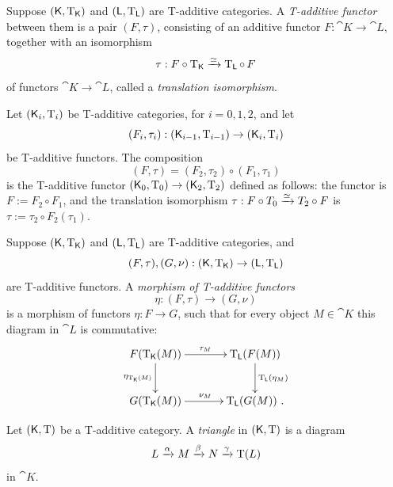 \begin{dfn} \label{dfn:1159} 
Suppose $(\operatorname{\mathsf{K}}, \operatorname{T}_{\operatorname{\mathsf{K}}})$ and 
$(\operatorname{\mathsf{L}}, \operatorname{T}_{\operatorname{\mathsf{L}}})$ are T-additive categories.
A {\em T-additive functor} between them is a pair 
$(F, \tau)$, consisting of an additive functor $F : \cat{K} \to \cat{L}$, 
together with an isomorphism
\[ \tau :  F \circ \operatorname{T}_{\operatorname{\mathsf{K}}}  \xrightarrow{\simeq} 
\operatorname{T}_{\operatorname{\mathsf{L}}} \circ \, F   \]
of functors $\cat{K} \to \cat{L}$,
called a {\em translation isomorphism}. 
\end{dfn}

\begin{dfn} \label{dfn:1840}
Let $(\operatorname{\mathsf{K}}_i, \operatorname{T}_i)$ be T-additive categories, for $i = 0, 1, 2$, and 
let 
\[ (F_i, \tau_i) : (\operatorname{\mathsf{K}}_{i - 1}, \operatorname{T}_{i - 1}) \to 
(\operatorname{\mathsf{K}}_i, \operatorname{T}_i) \]
be T-additive functors. The composition 
\[ (F, \tau) = (F_2, \tau_2) \circ (F_1, \tau_1) \]
is the T-additive functor 
$(\operatorname{\mathsf{K}}_0, \operatorname{T}_0) \to (\operatorname{\mathsf{K}}_2, \operatorname{T}_2)$
defined as follows: the functor is
$F := F_2 \circ F_1$, and the translation isomorphism 
$\tau : F \circ T_0 \xrightarrow{\simeq} T_2 \circ F$ 
is 
$\tau := \tau_2 \circ F_2(\tau_1)$. 
\end{dfn}

\begin{dfn} \label{dfn:1160} 
Suppose $(\operatorname{\mathsf{K}}, \operatorname{T}_{\operatorname{\mathsf{K}}})$ and 
$(\operatorname{\mathsf{L}}, \operatorname{T}_{\operatorname{\mathsf{L}}})$ are T-additive categories,
and 
\[ (F, \tau), (G, \nu) : (\operatorname{\mathsf{K}}, \operatorname{T}_{\operatorname{\mathsf{K}}}) \to 
(\operatorname{\mathsf{L}}, \operatorname{T}_{\operatorname{\mathsf{L}}}) \] 
are T-additive functors. A {\em morphism of T-additive functors}
\[ \eta : (F, \tau) \to (G, \nu) \] 
is a morphism of functors $\eta : F \to G$, such that for every object 
$M \in \cat{K}$ this diagram in $\cat{L}$ is commutative:
\[ \UseTips  \xymatrix @C=8ex @R=6ex {
F(\opn{T}_{\cat{K}}(M))
\ar[r]^{\tau_M}
\ar[d]_{\eta_{\lms \opn{T}_{\cat{K}}(M)}}
&
\opn{T}_{\cat{L}}(F(M))
\ar[d]^{\opn{T}_{\cat{L}}(\eta_M)}
\\
G(\opn{T}_{\cat{K}}(M))
\ar[r]^{\nu_M}
&
\opn{T}_{\cat{L}}(G(M)) \ . 
} \]
\end{dfn}

\begin{dfn} \label{dfn:1156} 
Let $(\operatorname{\mathsf{K}}, \operatorname{T})$ be a T-additive category. 
A {\em triangle} 
in $(\operatorname{\mathsf{K}}, \operatorname{T})$ is a diagram 
\[ L \xrightarrow{\alpha} M \xrightarrow{\beta} N \xrightarrow{\gamma} \operatorname{T}(L)  \]
in $\cat{K}$.
\end{dfn}

